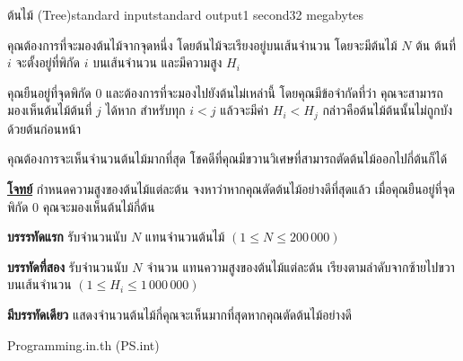 \documentclass[11pt,a4paper]{article}
\begin{document}
\begin{problem}{ต้นไม้ (Tree)}{standard input}{standard output}{1 second}{32 megabytes}

 คุณต้องการที่จะมองต้นไม้จากจุดหนึ่ง โดยต้นไม้จะเรียงอยู่บนเส้นจำนวน โดยจะมีต้นไม้ $N$ ต้น ต้นที่ $i$ จะตั้งอยู่ที่พิกัด $i$ บนเส้นจำนวน และมีความสูง $H_i$

                คุณยืนอยู่ที่จุดพิกัด $0$ และต้องการที่จะมองไปยังต้นไม่เหล่านี้ โดยคุณมีข้อจำกัดที่ว่า คุณจะสามารถมองเห็นต้นไม้ต้นที่ $j$ ได้หาก สำหรับทุก $i < j$ แล้วจะมีค่า $H_i < H_j$ กล่าวคือต้นไม้ต้นนั้นไม่ถูกบังด้วยต้นก่อนหน้า

                คุณต้องการจะเห็นจำนวนต้นไม้มากที่สุด โชคดีที่คุณมีขวานวิเศษที่สามารถตัดต้นไม้ออกไปกี่ต้นก็ได้

                

\bigskip
\underline{\textbf{โจทย์}}  กำหนดความสูงของต้นไม้แต่ละต้น จงหาว่าหากคุณตัดต้นไม้อย่างดีที่สุดแล้ว เมื่อคุณยืนอยู่ที่จุดพิกัด $0$ คุณจะมองเห็นต้นไม้กี่ต้น


\InputFile

\textbf{บรรรทัดแรก} รับจำนวนนับ $N$ แทนจำนวนต้นไม้ $( 1 \leq N \leq 200\,000 )$

\textbf{บรรทัดที่สอง} รับจำนวนนับ $N$ จำนวน แทนความสูงของต้นไม้แต่ละต้น เรียงตามลำดับจากซ้ายไปขวาบนเส้นจำนวน $( 1 \leq H_i \leq 1\,000\,000 )$


\OutputFile

\textbf{มีบรรทัดเดียว} แสดงจำนวนต้นไม้กี่คุณจะเห็นมากที่สุดหากคุณตัดต้นไม้อย่างดี

\Examples

\begin{example}
%
%
\end{example}


\Source

Programming.in.th (PS.int)

\end{problem}
\end{document}

